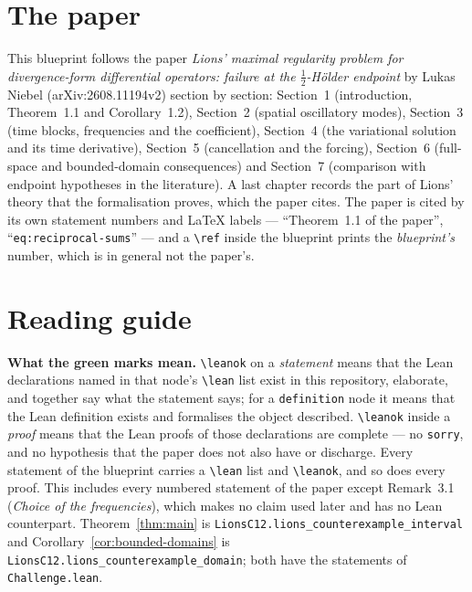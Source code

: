 
\section*{The paper}

This blueprint follows the paper \emph{Lions' maximal regularity problem for divergence-form
differential operators: failure at the $\frac12$-H\"older endpoint} by Lukas Niebel
(arXiv:2608.11194v2) section by section: Section~1 (introduction, Theorem~1.1 and
Corollary~1.2), Section~2 (spatial oscillatory modes), Section~3 (time blocks, frequencies and
the coefficient), Section~4 (the variational solution and its time derivative), Section~5
(cancellation and the forcing), Section~6 (full-space and bounded-domain consequences) and
Section~7 (comparison with endpoint hypotheses in the literature).  A last chapter records the
part of Lions' theory that the formalisation proves, which the paper cites.  The paper is cited
by its own statement numbers and LaTeX labels --- ``Theorem~1.1 of the paper'',
``\texttt{eq:reciprocal-sums}'' --- and a \texttt{\textbackslash ref} inside the blueprint
prints the \emph{blueprint's} number, which is in general not the paper's.

\section*{Reading guide}

\textbf{What the green marks mean.}  \texttt{\textbackslash leanok} on a \emph{statement}
means that the Lean declarations named in that node's \texttt{\textbackslash lean} list exist in
this repository, elaborate, and together say what the statement says; for a
\texttt{definition} node it means that the Lean definition exists and formalises the object
described.  \texttt{\textbackslash leanok} inside a \emph{proof} means that the Lean proofs of
those declarations are complete --- no \texttt{sorry}, and no hypothesis that the paper does not
also have or discharge.  Every statement of the blueprint carries a \texttt{\textbackslash lean}
list and \texttt{\textbackslash leanok}, and so does every proof.  This includes every numbered
statement of the paper except Remark~3.1 (\emph{Choice of the frequencies}), which makes no
claim used later and has no Lean counterpart.  Theorem~\ref{thm:main} is
\texttt{LionsC12.lions\_counterexample\_interval} and Corollary~\ref{cor:bounded-domains} is
\texttt{LionsC12.lions\_counterexample\_domain}; both have the statements of
\texttt{Challenge.lean}.

